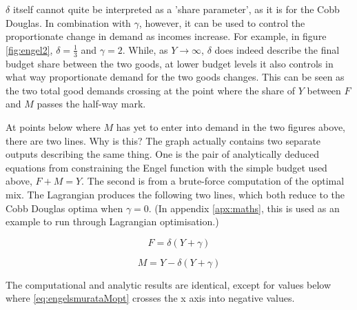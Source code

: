 
$\delta$ itself cannot quite be interpreted as a 'share parameter', as it is for the Cobb Douglas. In combination with $\gamma$, however, it can be used to control the proportionate change in demand as incomes increase. For example, in figure \ref{fig:engel2}, $\delta=\frac{1}{3}$ and $\gamma=2$. While, as $Y\rightarrow\infty$, $\delta$ does indeed describe the final budget share between the two goods, at lower budget levels it also controls in what way proportionate demand for the two goods changes. This can be seen as the two total good demands crossing at the point where the share of $Y$ between $F$ and $M$ passes the half-way mark.

At points below where $M$ has yet to enter into demand in the two figures above, there are two lines. Why is this? The graph actually contains two separate outputs describing the same thing. One is the pair of analytically deduced equations from constraining the Engel function with the simple budget used above, $F+M=Y$. The second is from a brute-force computation of the optimal mix. The Lagrangian produces the following two lines, which both reduce to the Cobb Douglas optima when $\gamma=0$. (In appendix \ref{apx:maths}, this is used as an example to run through Lagrangian optimisation.) 

\begin{equation}
F=\delta(Y+\gamma)\label{eq:engelsmurataFopt}
\end{equation}

\begin{equation}
M=Y-\delta(Y+\gamma)\label{eq:engelsmurataMopt}
\end{equation}

The computational and analytic results are identical, except for values below where \eqref{eq:engelsmurataMopt} crosses the x axis into negative values. 


